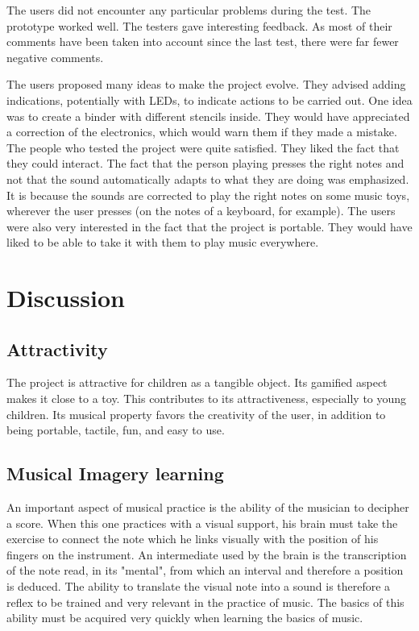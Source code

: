 The users did not encounter any particular problems during the test. The prototype worked well. The testers gave interesting feedback. As most of their comments have been taken into account since the last test, there were far fewer negative comments.

The users proposed many ideas to make the project evolve. They advised adding indications, potentially with LEDs, to indicate actions to be carried out. One idea was to create a binder with different stencils inside. They would have appreciated a correction of the electronics, which would warn them if they made a mistake. The people who tested the project were quite satisfied. They liked the fact that they could interact. The fact that the person playing presses the right notes and not that the sound automatically adapts to what they are doing was emphasized. It is because the sounds are corrected to play the right notes on some music toys, wherever the user presses (on the notes of a keyboard, for example). The users were also very interested in the fact that the project is portable. They would have liked to be able to take it with them to play music everywhere.

\section{Discussion}

\subsection{Attractivity}

The project is attractive for children as a tangible object. 
Its gamified aspect makes it close to a toy. This contributes to its attractiveness, especially to young children. Its musical property favors the creativity of the user, in addition to being portable, tactile, fun, and easy to use. 

\subsection{Musical Imagery learning}

An important aspect of musical practice is the ability of the musician to decipher a score. When this one practices with a visual support, his brain must take the exercise to connect the note which he links visually with the position of his fingers on the instrument. An intermediate used by the brain is the transcription of the note read, in its "mental", from which an interval and therefore a position is deduced. The ability to translate the visual note into a sound is therefore a reflex to be trained and very relevant in the practice of music. The basics of this ability must be acquired very quickly when learning the basics of music.

